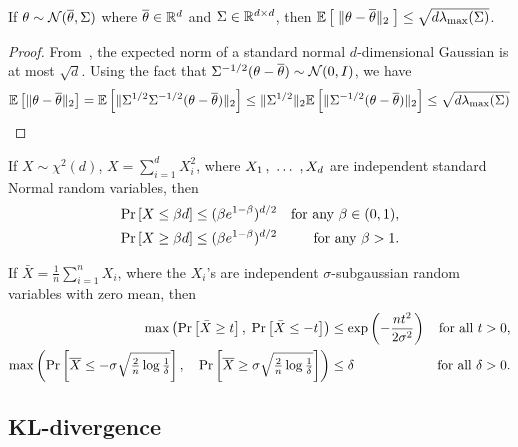 \begin{lemma}
  If $\theta \sim \mathcal{N}(\overline \theta, \Sigma)$ where $\overline \theta\in \mathbb{R}^d$ and $\Sigma \in \mathbb{R}^{d \times d}$, then
$\mathbb{E}\left[\; \|\theta - \overline \theta\|_2\; \right] \le \sqrt{d \lambda_{\max}(\Sigma)}$.
  \label{lem:gaus_norm}
\end{lemma}
\begin{proof}
  From~\cite{chandrasekaran2012convex}, the expected norm of a standard normal
  $d$-dimensional Gaussian is at most $\sqrt{d}$. Using the fact that
$\Sigma^{-1/2} (\theta - \overline \theta) \sim \mathcal{N}(0, I)$,
  we have
  \[
    \mathbb{E}\left[\|\theta - \overline \theta\|_2\right] = \mathbb{E}\left[\|\Sigma^{1/2} \Sigma^{-1/2}(\theta - \overline \theta)\|_2\right]
    \le \|\Sigma^{1/2}\|_2 \mathbb{E}\left[\|\Sigma^{-1/2}(\theta - \overline \theta)\|_2\right] \le
    \sqrt{d\lambda_{\max}(\Sigma)}
  \]
\end{proof}

\begin{lemma}
  If $X \sim \chi^2(d)$, \ie $X = \sum_{i=1}^d X_i^2$, where $X_1 \, ,\ \ldots\ , X_d$ are independent standard Normal random variables, then
  \begin{align*}
    \Pr\left[X \le \beta d\right] &\le (\beta e^{1-\beta})^{d/2} & \text{for any $\beta\in (0,1)$}, \\
    \Pr\left[X \ge \beta d\right] &\le (\beta e^{1-\beta})^{d/2} & \text{for any $\beta>1$}.
  \end{align*}
  \label{lem:chi_sq_conc}
\end{lemma}

\begin{lemma}
  If $\bar{X} = \frac{1}{n} \sum_{i=1}^n X_i$, where the $X_i$'s are independent
  $\sigma$-subgaussian random variables with zero mean, then
  \begin{align*}
    \max\left(\Pr\left[\bar{X} \ge t\right],\;\Pr\left[\bar{X} \le -t\right]\right)
     &\le \exp\left(-\frac{nt^2}{2\sigma^2}\right)
        &\text{for all $t>0$}, \\
  \max\left(
    \Pr\left[\overline{X} \le -\sigma
    \sqrt{\tfrac{2}{n}\log \tfrac{1}{\delta}}\right],\quad
    \Pr\left[\overline{X} \ge \sigma
    \sqrt{\tfrac{2}{n}\log \tfrac{1}{\delta}}\right]  \right) &\le \delta
    &\text{for all $\delta>0$}.
  \end{align*}
  \label{lem:hoeffding}
\end{lemma}


\subsection{KL-divergence}

